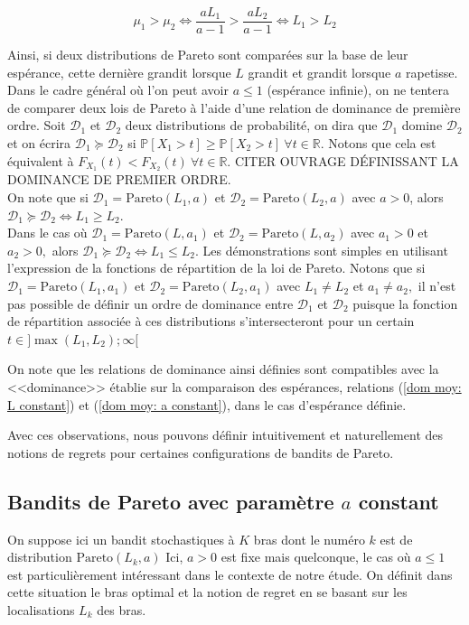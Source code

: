 \documentclass{article}
\renewcommand{\P}[1]{\mathbb{P}\left[ #1 \right]}
\begin{document}
\begin{equation}\label{dom moy: a constant}
\mu_1>\mu_2 \Leftrightarrow \frac{aL_1}{a-1}>\frac{aL_2}{a-1} \Leftrightarrow L_1>L_2
\end{equation}

Ainsi, si deux distributions de Pareto sont comparées sur la base de leur espérance, cette dernière grandit lorsque $L$ grandit et grandit lorsque $a$ rapetisse.\\

Dans le cadre général où l'on peut avoir $a\leq1$ (espérance infinie), on ne tentera de comparer deux lois de Pareto à l'aide d'une relation de dominance de première ordre. Soit $\mathcal{D}_1$ et $\mathcal{D}_2$ deux distributions de probabilité, on dira que $\mathcal{D}_1$ domine $\mathcal{D}_2$ et on écrira $\mathcal{D}_1\succeq \mathcal{D}_2$ si $\P{X_1>t}\geq \P{X_2>t}~\forall t \in \mathbb{R}.$ Notons que cela est équivalent à $F_{X_1}(t)<F_{X_2}(t)~\forall t \in \mathbb{R}.$ CITER OUVRAGE DÉFINISSANT LA DOMINANCE DE PREMIER ORDRE.\\

On note que si $\mathcal{D}_1=\mathrm{Pareto}(L_1,a)$ et $\mathcal{D}_2=\mathrm{Pareto}(L_2,a)$ avec $a>0$, alors $\mathcal{D}_1\succeq \mathcal{D}_2 \Leftrightarrow L_1 \geq L_2.$\\
Dans le cas où $\mathcal{D}_1=\mathrm{Pareto}(L,a_1)$ et $\mathcal{D}_2=\mathrm{Pareto}(L,a_2)$ avec $a_1>0$ et $a_2>0,$ alors $\mathcal{D}_1\succeq \mathcal{D}_2 \Leftrightarrow L_1 \leq L_2.$ Les démonstrations sont simples en utilisant l'expression de la fonctions de répartition de la loi de Pareto. Notons que si $\mathcal{D}_1=\mathrm{Pareto}(L_1,a_1)$ et $\mathcal{D}_2=\mathrm{Pareto}(L_2,a_1)$ avec $L_1\neq L_2$ et $a_1\neq a_2,$ il n'est pas possible de définir un ordre de dominance entre $\mathcal{D}_1$ et $\mathcal{D}_2$ puisque la fonction de répartition associée à ces distributions s'intersecteront pour un certain $t\in]\max(L_1,L_2);\infty[$

On note que les relations de dominance ainsi définies sont compatibles avec la <<dominance>> établie sur la comparaison des espérances, relations (\ref{dom moy: L constant}) et (\ref{dom moy: a constant}), dans le cas d'espérance définie.

Avec ces observations, nous pouvons définir intuitivement et naturellement des notions de regrets pour certaines configurations de bandits de Pareto.

\subsection{Bandits de Pareto avec paramètre $a$ constant}
On suppose ici un bandit stochastiques à $K$ bras dont le numéro $k$ est de distribution $\mathrm{Pareto}(L_k,a)$ 
Ici, $a>0$ est fixe mais quelconque, le cas où $a\leq1$ est particulièrement intéressant dans le contexte de notre étude. On définit dans cette situation le bras optimal et la notion de regret en se basant sur les localisations $L_k$ des bras.
\end{document}

